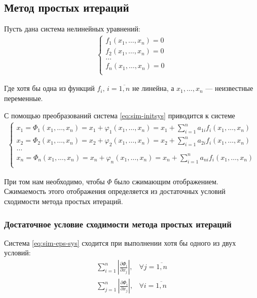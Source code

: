 \subsection{Метод простых итераций}
Пусть дана система нелинейных уравнений:
\begin{align}\label{eq:sim-initsys}
	\begin{cases}
		f_1(x_1,\dots,x_n) = 0 \\
		f_2(x_1,\dots,x_n) = 0 \\
		\dots                  \\
		f_n(x_1,\dots,x_n) = 0 \\
	\end{cases}
\end{align}

Где хотя бы одна из функций \(f_i,\, i=\overline{1,n}\) не линейна, а \(x_1,\dots,x_n\) --- неизвестные переменные.

С помощью преобразований система \cref{eq:sim-initsys} приводится к системе
\begin{align}\label{eq:sim-eps-sys}
	\begin{cases}
		x_1 = \Phi_1(x_1,\dots,x_n)= x_1+ \varphi_1(x_1,\dots,x_n) = x_1+\sum_{i = 1}^n a_{1 i} f_i(x_1,\dots,x_n) \\
		x_2 = \Phi_2(x_1,\dots,x_n)= x_2+ \varphi_2(x_1,\dots,x_n) = x_2+\sum_{i = 1}^n a_{2 i} f_i(x_1,\dots,x_n) \\
		\dots                                                                                                      \\
		x_n = \Phi_n(x_1,\dots,x_n)= x_n+ \varphi_n(x_1,\dots,x_n) = x_n+\sum_{i = 1}^n a_{n i} f_i(x_1,\dots,x_n) \\
	\end{cases}
\end{align}

При том нам необходимо, чтобы \(\Phi \) было сжимающим отображением. Сжимаемость этого отображения определяется из достаточных условий сходимости метода простых итераций.

\subsubsection*{Достаточное условие сходимости метода простых итераций}
Система \cref{eq:sim-eps-sys} сходится при выполнении хотя бы одного из двух условий:
\begin{align}\label{eq:finalise-condition}
	\sum_{i=1}^n\left| \frac{\partial \Phi_i}{\partial x_j} \right|, & \forall j = \overline{1, n} \\
	\sum_{j=1}^n\left| \frac{\partial \Phi_i}{\partial x_j} \right|, & \forall i = \overline{1, n}
\end{align}

